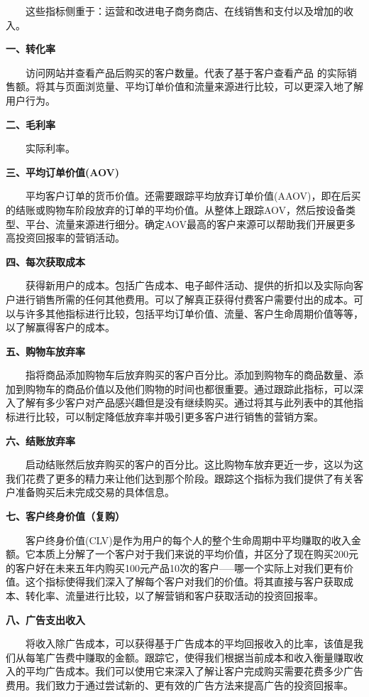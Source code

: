 \documentclass[
  letterpaper,
  DIV=11,
  numbers=noendperiod]{scrreprt}
\begin{document}
  这些指标侧重于：运营和改进电子商务商店、在线销售和支付以及增加的收入。

\textbf{一、转化率}

  访问网站并查看产品后购买的客户数量。代表了基于客户查看产品
的实际销售额。将其与页面浏览量、平均订单价值和流量来源进行比较，可以更深入地了解用户行为。

\textbf{二、毛利率}

  实际利率。

\textbf{三、平均订单价值(AOV)}

  平均客户订单的货币价值。还需要跟踪平均放弃订单价值(AAOV)，即在后买的结账或购物车阶段放弃的订单的平均价值。从整体上跟踪AOV，然后按设备类型、平台、流量来源进行细分。确定AOV最高的客户来源可以帮助我们开展更多高投资回报率的营销活动。

\textbf{四、每次获取成本}

  获得新用户的成本。包括广告成本、电子邮件活动、提供的折扣以及实际向客户进行销售所需的任何其他费用。可以了解真正获得付费客户需要付出的成本。可以与许多其他指标进行比较，包括平均订单价值、流量、客户生命周期价值等等，以了解赢得客户的成本。

\textbf{五、购物车放弃率}

  指将商品添加购物车后放弃购买的客户百分比。添加到购物车的商品数量、添加到购物车的商品价值以及他们购物的时间也都很重要。通过跟踪此指标，可以深入了解有多少客户对产品感兴趣但是没有继续购买。通过将其与此列表中的其他指标进行比较，可以制定降低放弃率并吸引更多客户进行销售的营销方案。

\textbf{六、结账放弃率}

  启动结账然后放弃购买的客户的百分比。这比购物车放弃更近一步，这以为这我们花费了更多的精力来让他们达到那个阶段。跟踪这个指标为我们提供了有关客户准备购买后未完成交易的具体信息。

\textbf{七、客户终身价值（复购）}

  客户终身价值(CLV)是作为用户的每个人的整个生命周期中平均赚取的收入金额。它本质上分解了一个客户对于我们来说的平均价值，并区分了现在购买200元的客户好在未来五年内购买100元产品10次的客户-----哪一个实际上对我们更有价值。这个指标使得我们深入了解每个客户对我们的价值。将其直接与客户获取成本、转化率、流量进行比较，以了解营销和客户获取活动的投资回报率。

\textbf{八、广告支出收入}

  将收入除广告成本，可以获得基于广告成本的平均回报收入的比率，该值是我们从每笔广告费中赚取的金额。跟踪它，使得我们根据当前成本和收入衡量赚取收入的平均广告成本。我们可以使用它来深入了解让客户完成购买需要花费多少广告费用。我们致力于通过尝试新的、更有效的广告方法来提高广告的投资回报率。
\end{document}
